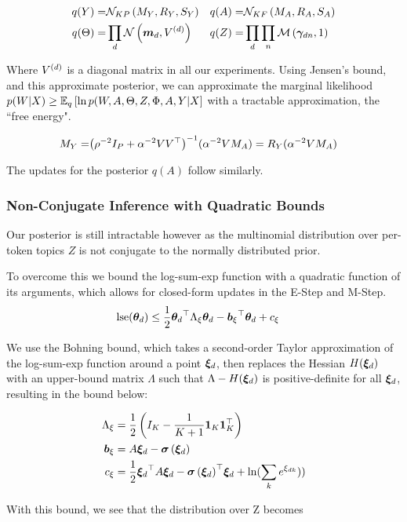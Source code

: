 \begin{align}
q(Y) = & \mnord{KP}{M_Y}{R_Y}{S_Y} & q(A) = & \mnord{KF}{M_A}{R_A}{S_A} \\ 
q(\Theta) = & \prod_d \nor{\md}{\Vd} & q(Z) = & \prod_d \prod_n \muln{\vv{\gamma}_{dn}}{1} 
\end{align}


Where $\Vd$ is a diagonal matrix in all our experiments. Using Jensen's bound, and this approximate posterior, we can approximate the marginal likelihood $p(W | X) \geq \ex{\ln p(W,A,\Theta,Z,\Phi,A,Y| X}{q}$ with a tractable approximation, the ``free energy".



\begin{align}
M_Y = & \invb{\rho^{-2} I_P + \alpha^{-2} V V\T}(\alpha^{-2}V M_A) = R_Y (\alpha^{-2} V M_A)
\end{align}

The updates for the posterior $q(A)$ follow similarly.

\subsubsection{Non-Conjugate Inference with Quadratic Bounds}
Our posterior is still intractable however as the multinomial distribution over per-token topics $Z$ is not conjugate to the normally distributed prior.

To overcome this we bound the log-sum-exp function with a quadratic function of its arguments, which allows for closed-form updates in the E-Step and M-Step. 
\begin{align}
\lse(\thd) & \leq \half \thd\T \Axi \thd - \bxi\T\thd + \cxi
\end{align}

We use the Bohning bound\cite{Bohning1988}, which takes a second-order Taylor approximation of the log-sum-exp function around a point $\Ed$, then replaces the Hessian $H(\Ed)$ with an upper-bound matrix $\Lambda$ such that $\Lambda - H(\Ed)$ is positive-definite for all $\Ed$, resulting in the bound below:

\begin{align}
\Axi & = \half \left(I_K - \frac{1}{K+1}\mathbf{1}_K\mathbf{1}_K\T   \right) \\
\bxi & = A \Ed  - \sigmoid{\Ed} \\
\cxi & = \half \Ed\T A \Ed - \sigmoid{\Ed}\T\Ed + \ln(\sum_k e^{\Edk}))
\end{align} 


With this bound, we see that the distribution over Z becomes


